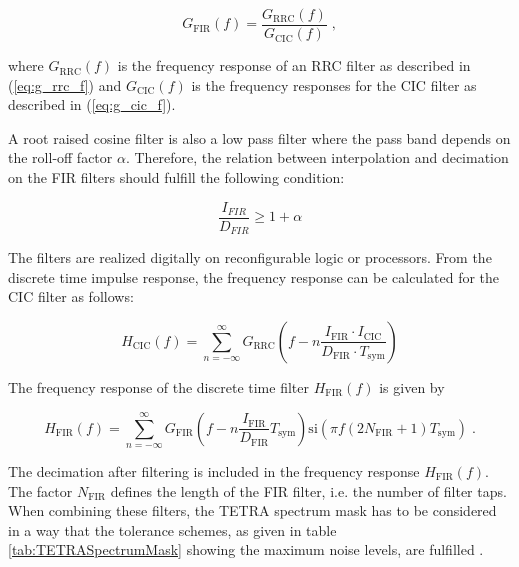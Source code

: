 \begin{equation}
	G_{\text{FIR}}(f) = \frac{G_{\text{RRC}}(f)}{G_{\text{CIC}}(f)}\;,
\end{equation}

where $G_{\text{RRC}}(f)$ is the frequency response of an RRC filter as described in (\ref{eq:g_rrc_f}) and $G_{\text{CIC}}(f)$ is the frequency responses for the \ac{CIC} filter as described in (\ref{eq:g_cic_f}).

A root raised cosine filter is also a low pass filter where the pass band depends on the roll-off factor $\alpha$. Therefore, the relation between interpolation and decimation on the FIR filters should fulfill the following condition: 

\begin{equation}
\frac{I_{FIR}}{D_{FIR}} \geq 1 + \alpha
\label{eq:crit}
\end{equation}

The filters are realized digitally on reconfigurable logic or processors. From the discrete time impulse response, the frequency response can be calculated for the CIC filter as follows:

\begin{equation}
	H_\text{CIC}(f) = \sum_{n=-\infty}^{\infty} G_\text{RRC} \left(f-n \frac{I_\text{FIR}\cdot I_\text{CIC}} {D_\text{FIR}\cdot T_\text{sym}}  \right)
\end{equation}

The frequency response of the discrete time filter $H_\text{FIR}(f)$ is given by

\begin{equation}
H_\text{FIR}(f) = \sum_{n=-\infty}^{\infty}G_\text{FIR}{\left(f-n \frac{I_\text{FIR}}{D_\text{FIR}}T_\text{sym} \right)} \text{si} \left( \pi f (2N_\text{FIR}+1) T_\text{sym} \right)\;.
\end{equation}

The decimation after filtering is included in the frequency response $H_\text{FIR}(f)$. The factor $N_\text{FIR}$  defines the length of the FIR filter, i.e. the number of filter taps. When combining these filters, the TETRA spectrum mask has to be considered in a way that the tolerance schemes, as given in table \ref{tab:TETRASpectrumMask} showing the maximum noise levels, are fulfilled .

